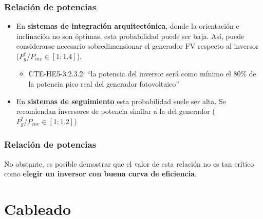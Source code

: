 \documentclass[serif, xcolor=dvipsnames]{beamer}
\begin{document}
\begin{frame}
  \frametitle{Relación de potencias}
  \begin{itemize}
  \item En \textbf{sistemas de integración arquitectónica}, donde la
    orientación e inclinación no son óptimas, esta probabilidad puede
    ser baja. Así, puede considerarse necesario sobredimensionar el
    generador FV respecto al inversor
    ($P_{g}^{*}/P_{inv}\in\left[1;1.4\right]$).

    \begin{itemize}
    \item CTE-HE5-3.2.3.2: {}``la potencia del inversor será como
      mínimo el 80\% de la potencia pico real del generador
      fotovoltaico''
    \end{itemize}
  \item En \textbf{sistemas de seguimiento} esta probabilidad suele
    ser alta.  Se recomiendan inversores de potencia similar a la del
    generador ($P_{g}^{*}/P_{inv}\in\left[1;1.2\right]$)
  \end{itemize}

\end{frame}
\begin{frame}
  \frametitle{Relación de potencias}
  \begin{block} {}

    No obstante, es posible demostrar que el valor de esta relación no
    es tan crítico como \textbf{elegir un inversor con buena curva de
      eficiencia}.

  \end{block}
\end{frame}

\section{Cableado}
\end{document}
